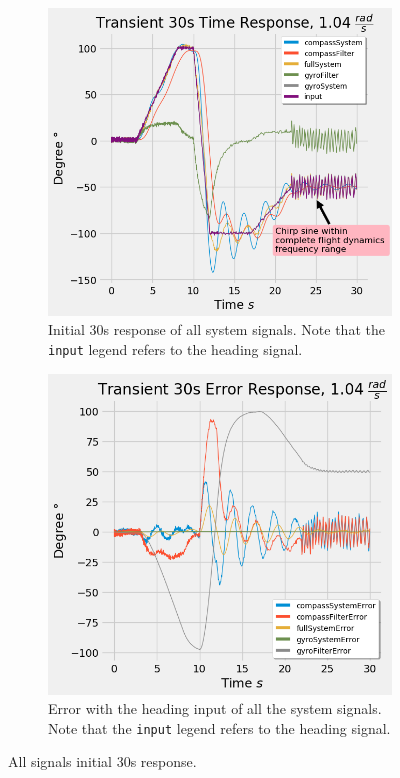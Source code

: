 \begin{figure}[H]
\centering
\begin{subfigure}{0.495\textwidth}
  \centering
  \includegraphics[width=\linewidth]{img/allSignalsTimeResponse30s_1_0476.png}
  \caption{Initial 30s response of all system signals. Note that the \texttt{input} legend refers to the heading signal.}
  \label{fig:raw_time_signals_transient}
\end{subfigure}
\begin{subfigure}{0.495\textwidth}
  \centering
  \includegraphics[width=\linewidth]{img/errorSignalsTimeResponse30s_1_0476.png}
  \caption{Error with the heading input of all the system signals. Note that the \texttt{input} legend refers to the heading signal.}
  \label{fig:raw_error_signals_transient}
\end{subfigure}
\caption{All signals initial 30s response.}
\end{figure}



